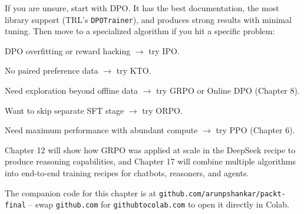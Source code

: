 \begin{chapterenv}
\begin{tipbox}
If you are unsure, start with DPO. It has the best documentation, the most library support (TRL's \texttt{DPOTrainer}), and produces strong results with minimal tuning. Then move to a specialized algorithm if you hit a specific problem:

DPO overfitting or reward hacking $\to$ try IPO.

No paired preference data $\to$ try KTO.

Need exploration beyond offline data $\to$ try GRPO or Online DPO (Chapter 8).

Want to skip separate SFT stage $\to$ try ORPO.

Need maximum performance with abundant compute $\to$ try PPO (Chapter 6).

Chapter 12 will show how GRPO was applied at scale in the DeepSeek recipe to produce reasoning capabilities, and Chapter 17 will combine multiple algorithms into end-to-end training recipes for chatbots, reasoners, and agents.
\end{tipbox}


The companion code for this chapter is at \texttt{github.com/arunpshankar/packt-final} -- swap \texttt{github.com} for \texttt{githubtocolab.com} to open it directly in Colab.

\end{chapterenv}